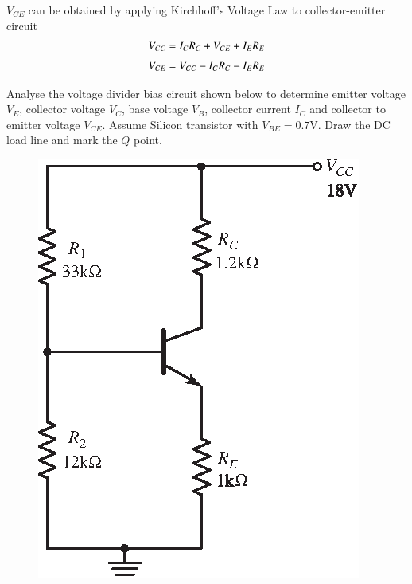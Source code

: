 $V_{CE}$ can be obtained by applying Kirchhoff's Voltage Law to collector-emitter circuit
\begin{align}
V_{CC} &= I_{C}R_{C}+V_{CE}+I_{E}R_{E}\notag\\[3pt]
V_{CE} &= V_{CC}-I_{C}R_{C}-I_{E}R_{E}\label{eq4.31}
\end{align}

\begin{example}\label{exam4.14}
Analyse the voltage divider bias circuit shown below to determine emitter voltage $V_{E}$, collector voltage $V_{C}$, base voltage $V_{B}$, collector current $I_{C}$ and collector to emitter voltage $V_{CE}$. Assume Silicon transistor with $V_{BE}=0.7\text{V}$. Draw the DC load line and mark the $Q$ point.
\begin{figure}[H]
\centering
\includegraphics[scale=1.05]{chap3/S3-EE-03-IN023.eps}
\end{figure}
\end{example}

